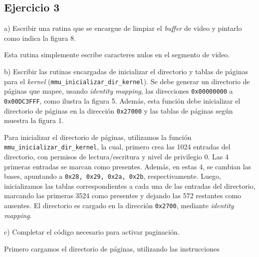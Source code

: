 \subsection*{Ejercicio 3}
\vspace*{0.5cm}

\noindent
a) Escribir una rutina que se encargue de limpiar el \textit{buffer} de video y pintarlo como indica la figura 8.

\vspace*{0.3cm}

Esta rutina simplemente escribe caracteres nulos en el segmento de video.

\vspace*{0.5cm} \noindent



\noindent
b) Escribir las rutinas encargadas de inicializar el directorio y tablas de páginas para el \textit{kernel}\newline
(\verb|mmu_inicializar_dir_kernel|). Se debe generar un directorio de páginas que mapee, usando \textit{identity mapping}, 
las direcciones \verb|0x00000000| a \verb|0x00DC3FFF|, como ilustra la figura 5. Además, esta función debe inicializar
el directorio de páginas en la dirección \verb|0x27000| y las tablas de páginas según muestra la figura 1.

\vspace*{0.3cm}

Para inicializar el directorio de p\'aginas, utilizamos la funci\'on \verb|mmu_inicializar_dir_kernel|, la cual, 
primero crea las 1024 entradas del directorio, con permisos de lectura/escritura y nivel de privilegio 0. Las 4 
primeras entradas se marcan como presentes. Adem\'as, en estas 4, se cambian las bases, apuntando a \verb|0x28, 0x29, 0x2a, 0x2b|,  respectivamente. Luego, inicializamos las tablas correspondientes a cada una de las entradas del directorio, marcando 
las primeras 3524 como presentes y dejando las 572 restantes como ausentes. El directorio es cargado en la direcci\'on 
\verb|0x2700|, mediante \textit{identity mapping}.

\vspace*{0.5cm} \noindent



\noindent
c) Completar el código necesario para activar paginación.

\vspace*{0.3cm}

Primero cargamos el directorio de p\'aginas, utilizando las instrucciones 


